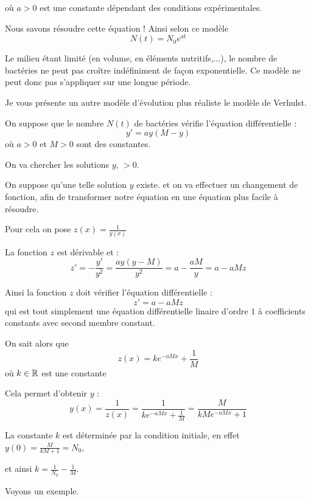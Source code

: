 \change
où $a>0$ est une constante dépendant des conditions expérimentales.

\change
Nous savons résoudre cette équation ! Ainsi selon ce modèle
$$N(t) = N_0 e^{at}$$

\change
Le milieu étant limité (en volume, en éléments nutritifs,...), 
le nombre de bactéries ne peut pas croître indéfiniment 
de façon exponentielle. Ce modèle ne peut donc pas 
s'appliquer sur une longue période.


\diapo


Je vous présente un autre modèle d'évolution plus 
réaliste le modèle de Verhulst.


\change
On suppose que le nombre $N(t)$ de bactéries vérifie 
l'équation différentielle : 
\begin{equation}
  y' = ay(M - y)
  \label{eq:eqdiffverhulst}
  \tag{$E$}
\end{equation}
où $a>0$ et $M>0$ sont des constantes.

\change
On va chercher les solutions $y$, $>0$.


\change
On suppose qu'une telle solution $y$ existe.
et on va effectuer un changement de fonction,
afin de transformer notre équation en une équation 
plus facile à résoudre.

\change
  Pour cela on pose $z(x) = \frac{1}{y(x)}$
  
  \change
  La fonction $z$ est dérivable et :
  $$z'=-\frac{y'}{y^2} = \frac{ay(y-M)}{y^2} = a - \frac{aM}{y} = a-aMz$$

  \change
  \change
  Ainsi la fonction $z$ doit vérifier l'équation différentielle :
  $$z' = a-aMz$$  
  qui est tout simplement une équation différentielle linaire d'ordre $1$ 
  à coefficients constants avec second membre constant.
  
  \change
  On sait alors que 
  $$z(x) = k e^{-aMx} + \frac1M$$
  où $k \in \mathbb{R}$ est une constante

  \change
  \change
  Cela permet d'obtenir $y$ :
  $$y(x) = \frac{1}{z(x)} = \frac{1}{k e^{-aMx} + \frac1M} = \frac{M}{kM e^{-aMx}+1}$$
  
  \change
  La constante $k$ est déterminée par la condition initiale,
  en effet 
  $y(0) = \frac{M}{kM+1}=N_0$, 
  
  et ainsi $k = \frac{1}{N_0}-\frac{1}{M}$.
  

\diapo

Voyons un exemple.

